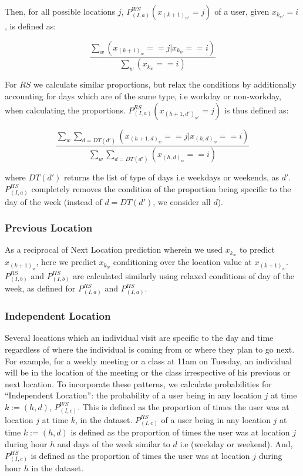 Then, for all possible locations $j$, $P_{(I,a)}^{WS} (x_{(k+1)_{w'}}=j)$ of a user, given $x_{k_{w'}}=i$, is defined as: 
\begin{small}
\[
\frac{\sum\limits_{w} (x_{(k+1)_w}==j | x_{k_w}==i)} {\sum\limits_{w} (x_{k_w}==i)}
\]
\end{small}
For ${RS}$ we calculate similar proportions, but relax the conditions by additionally accounting for days which are of the same type, i.e workday or non-workday, when calculating the proportions. $P_{(I,a)}^{RS} (x_{(h+1,d')_{w'}}=j)$ is thus defined as:
\begin{small}
\[
 \frac{\sum\limits_{w} \sum\limits_{d=DT(d')} (x_{(h+1,d)_w}==j | x_{(h,d)_w}==i) } {\sum\limits_{w} \sum\limits_{d=DT(d')} (x_{(h,d)_w}==i)}
\]
\end{small}
where $DT(d')$ returns the list of type of days i.e weekdays or weekends, as $d'$. $P_{(I,a)}^{HS}$ completely removes the condition of the proportion being specific to the day of the week (instead of $d=DT(d')$, we consider all $d$).

\subsubsection{Previous Location} 
As a reciprocal of Next Location prediction wherein we used $x_{k_w}$ to predict $x_{(k+1)_w}$, here we predict $x_{k_w}$ conditioning over the location value at $x_{(k+1)_w}$. 
$P_{(I,b)}^{RS}$ and $P_{(I,b)}^{HS}$ are calculated similarly using relaxed conditions of day of the week, as defined for $P_{(I,a)}^{RS}$ and $P_{(I,a)}^{HS}$.

\subsubsection{Independent Location}
Several locations which an individual visit are specific to the day and time regardless of where the individual is coming from or where they plan to go next. For example, for a weekly meeting or a class at 11am on Tuesday, an individual will be in the location of the meeting or the class irrespective of his previous or next location. To incorporate these patterns, we calculate probabilities for ``Independent Location'': the probability of a user being in any location $j$ at time $k := (h,d)$, $P_{(I,c)}^{WS}$. This is defined as the proportion of times the user was at location $j$ at time $k$, in the dataset. $P_{(I,c)}^{RS}$ of a user being in any location $j$ at time $k := (h,d)$ is defined as the proportion of times the user was at location $j$ during hour $h$ and days of the week similar to $d$ i.e (weekday or weekend). And, $P_{(I,c)}^{HS}$ is defined as the proportion of times the user was at location $j$ during hour $h$ in the dataset.


